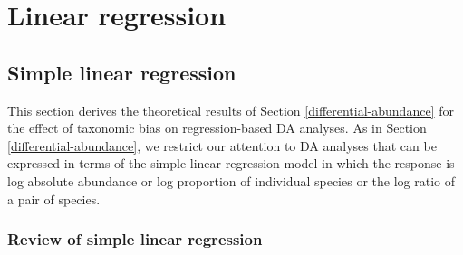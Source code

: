 \documentclass[
]{article}
\begin{document}
\clearpage

\hypertarget{appendix-appendix}{%
\appendix {}}


\hypertarget{appendix-regression}{%
\section{Linear regression}\label{appendix-regression}}

\hypertarget{simple-linear-regression}{%
\subsection{Simple linear regression}\label{simple-linear-regression}}

This section derives the theoretical results of Section \ref{differential-abundance} for the effect of taxonomic bias on regression-based DA analyses.
As in Section \ref{differential-abundance}, we restrict our attention to DA analyses that can be expressed in terms of the simple linear regression model in which the response is log absolute abundance or log proportion of individual species or the log ratio of a pair of species.

\hypertarget{review-of-simple-linear-regression}{%
\subsubsection{Review of simple linear regression}\label{review-of-simple-linear-regression}}
\end{document}
